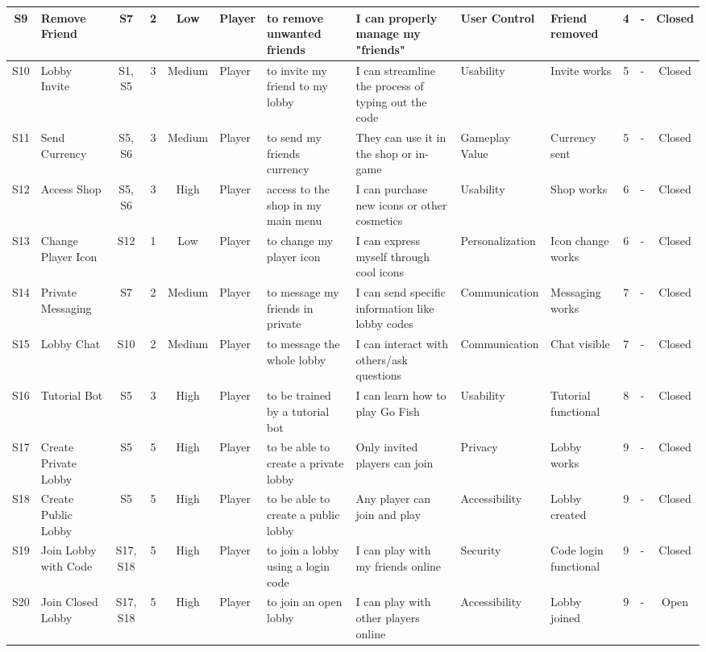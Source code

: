 \begin{table}[h]
{\begin{tabular}{|c|p{3cm}|c|c|c|p{4cm}|p{4cm}|p{4cm}|p{4cm}|p{3cm}|c|p{3cm}|c|}
S9 & Remove Friend & S7 & 2 & Low & Player & to remove unwanted friends & I can properly manage my "friends" & User Control & Friend removed & 4 & - & Closed \\ \hline
S10 & Lobby Invite & S1, S5 & 3 & Medium & Player & to invite my friend to my lobby & I can streamline the process of typing out the code & Usability & Invite works & 5 & - & Closed \\ \hline
S11 & Send Currency & S5, S6 & 3 & Medium & Player & to send my friends currency & They can use it in the shop or in-game & Gameplay Value & Currency sent & 5 & - & Closed \\ \hline
S12 & Access Shop & S5, S6 & 3 & High & Player & access to the shop in my main menu & I can purchase new icons or other cosmetics & Usability & Shop works & 6 & - & Closed \\ \hline
S13 & Change Player Icon & S12 & 1 & Low & Player & to change my player icon & I can express myself through cool icons & Personalization & Icon change works & 6 & - & Closed \\ \hline
S14 & Private Messaging & S7 & 2 & Medium & Player & to message my friends in private & I can send specific information like lobby codes & Communication & Messaging works & 7 & - & Closed \\ \hline
S15 & Lobby Chat & S10 & 2 & Medium & Player & to message the whole lobby & I can interact with others/ask questions & Communication & Chat visible & 7 & - & Closed \\ \hline
S16 & Tutorial Bot & S5 & 3 & High & Player & to be trained by a tutorial bot & I can learn how to play Go Fish & Usability & Tutorial functional & 8 & - & Closed \\ \hline
S17 & Create Private Lobby & S5 & 5 & High & Player & to be able to create a private lobby & Only invited players can join & Privacy & Lobby works & 9 & - & Closed \\ \hline
S18 & Create Public Lobby & S5 & 5 & High & Player & to be able to create a public lobby & Any player can join and play & Accessibility & Lobby created & 9 & - & Closed \\ \hline
S19 & Join Lobby with Code & S17, S18 & 5 & High & Player & to join a lobby using a login code & I can play with my friends online & Security & Code login functional & 9 & - & Closed \\ \hline
S20 & Join Closed Lobby & S17, S18 & 5 & High & Player & to join an open lobby & I can play with other players online & Accessibility & Lobby joined & 9 & - & Open \\ \hline

\end{tabular}}
\end{table}
